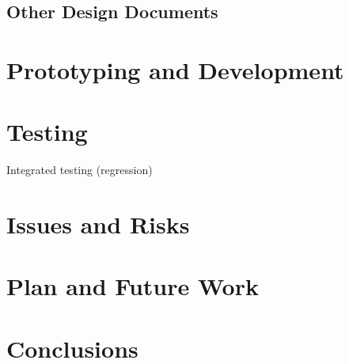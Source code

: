 \documentclass[a4paper, 12pt]{article}
\begin{document}
\subsection{Other Design Documents}
\section{Prototyping and Development}
\section{Testing}
Integrated testing (regression)
\section{Issues and Risks}
\section{Plan and Future Work}
\section{Conclusions}
\end{document}
